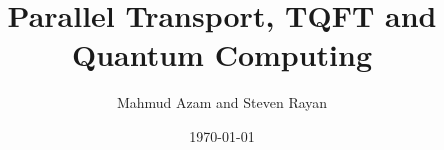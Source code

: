 
\title{Parallel Transport, TQFT and Quantum Computing}
\author{Mahmud Azam and Steven Rayan}
\date{\today}
\maketitle

